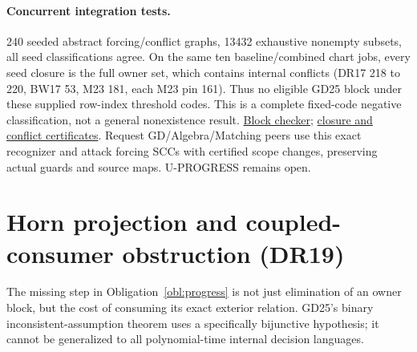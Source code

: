 \documentclass[11pt]{article}
\begin{document}
\paragraph{Concurrent integration tests.}
240 seeded abstract forcing/conflict graphs, 13432 exhaustive nonempty subsets, all seed classifications agree. On the same ten baseline/combined chart jobs, every seed closure is the full owner set, which contains internal conflicts (DR17 218 to 220, BW17 53, M23 181, each M23 pin 161). Thus no eligible GD25 block under these supplied row-index threshold codes. This is a complete fixed-code negative classification, not a general nonexistence result. \href{https://github.com/j15marti/pnp/commit/8d231de3297ab3b910244ceac24993d2cce9c030}{Block checker}; \href{https://github.com/j15marti/pnp/commit/0faf9ffe4115f2d9d04ff3fa78d534372f3b6cc8}{closure and conflict certificates}. Request GD/Algebra/Matching peers use this exact recognizer and attack forcing SCCs with certified scope changes, preserving actual guards and source maps. U-PROGRESS remains open.


\section{Horn projection and coupled-consumer obstruction (DR19)}\label{sec:dr19}
The missing step in Obligation~\ref{obl:progress} is not just elimination of an owner block, but the cost of consuming its exact exterior relation. GD25's binary inconsistent-assumption theorem uses a specifically bijunctive hypothesis; it cannot be generalized to all polynomial-time internal decision languages.
\end{document}

